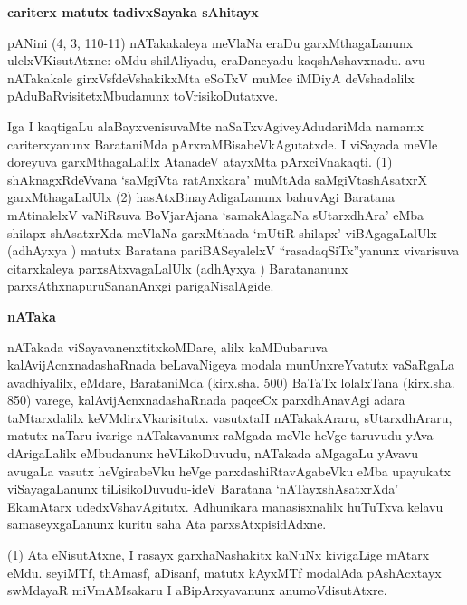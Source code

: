 \newpage

\begin{center}
{\Large\bf cariterx matutx tadivxSayaka sAhitayx}
\end{center}

pANini (4, 3, 110-11) nATakakaleya meVlaNa eraDu garxMthagaLanunx ulelxVKisutAtxne: oMdu shilAliyadu, eraDaneyadu kaqshAshavxnadu. avu nATakakale girxVsfdeVshakikxMta eSoTxV muMce iMDiyA deVshadalilx pAduBaRvisitetxMbudanunx toVrisikoDutatxve.

Iga I kaqtigaLu alaBayxvenisuvaMte naSaTxvAgiveyAdudariMda namamx cariterxyanunx BarataniMda pArxraMBisabeVkAgutatxde. I viSayada meVle doreyuva garxMthagaLalilx AtanadeV atayxMta pArxciVnakaqti. (1) shAknagxRdeVvana `saMgiVta ratAnxkara' muMtAda saMgiVtashAsatxrX garxMthagaLalUlx (2) hasAtxBinayAdigaLanunx bahuvAgi Baratana mAtinalelxV vaNiRsuva BoVjarAjana `samakAlagaNa sUtarxdhAra' eMba shilapx shAsatxrXda meVlaNa garxMthada `mUtiR shilapx' viBAgagaLalUlx (adhAyxya ) matutx Baratana pariBASeyalelxV ``rasadaqSiTx''yanunx vivarisuva citarxkaleya parxsAtxvagaLalUlx (adhAyxya ) Baratananunx parxsAthxnapuruSananAnxgi parigaNisalAgide.

\smallskip
\begin{center}
{\Large\bf nATaka}
\end{center}

nATakada viSayavanenxtitxkoMDare, alilx kaMDubaruva kalAvijAcnxnadashaRnada beLavaNigeya modala munUnxreYvatutx vaSaRgaLa avadhiyalilx, eMdare, BarataniMda (kirx.sha. 500) BaTaTx lolalxTana (kirx.sha. 850) varege, kalAvijAcnxnadashaRnada paqceCx parxdhAnavAgi adara taMtarxdalilx keVMdirxVkarisitutx. vasutxtaH nATakakAraru, sUtarxdhAraru, matutx naTaru ivarige nATakavanunx raMgada meVle heVge taruvudu yAva dArigaLalilx eMbudanunx heVLikoDuvudu, nATakada aMgagaLu yAvavu avugaLa vasutx heVgirabeVku heVge parxdashiRtavAgabeVku eMba upayukatx viSayagaLanunx tiLisikoDuvudu-ideV Baratana `nATayxshAsatxrXda' EkamAtarx udedxVshavAgitutx. Adhunikara manasisxnalilx huTuTxva kelavu samaseyxgaLanunx kuritu saha Ata parxsAtxpisidAdxne.

(1) Ata eNisutAtxne, I rasayx garxhaNashakitx kaNuNx kivigaLige mAtarx eMdu. seyiMTf, thAmasf, aDisanf, matutx kAyxMTf modalAda pAshAcxtayx swMdayaR miVmAMsakaru I aBipArxyavanunx anumoVdisutAtxre.

